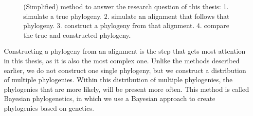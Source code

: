 \begin{figure}[H]
{
  }
  \caption{
    (Simplified) method to answer the research question of this thesis:
    1. simulate a true phylogeny. 
    2. simulate an alignment that follows that phylogeny. 
    3. construct a phylogeny from that alignment.
    4. compare the true and constructed phylogeny.
  }
  \label{fig:research_workflow_single}
\end{figure}

Constructing a phylogeny from an alignment is the step that
gets most attention in this thesis, as it is also the most complex
one. Unlike the methods described earlier, 
we do not construct one single phylogeny, 
but we construct a distribution of multiple phylogenies.
Within this distribution of multiple phylogenies, the phylogenies
that are more likely, will be present more often.
This method is called Bayesian phylogenetics, in which we use
a Bayesian approach to create phylogenies based on genetics.

